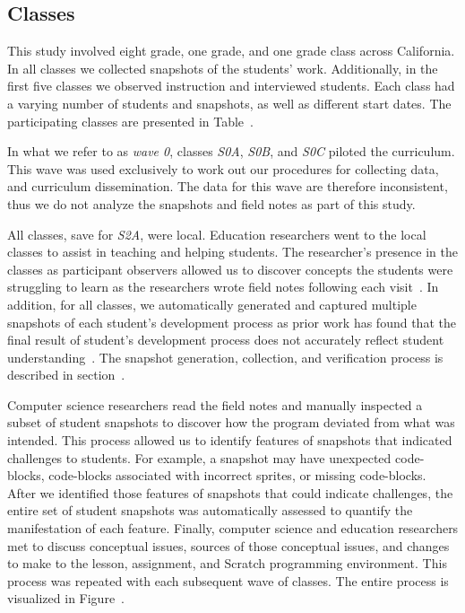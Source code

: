 \subsection{Classes}
This study involved eight  grade, one  grade, and one 
grade class across California. In all classes we collected snapshots of the
students' work. Additionally, in the first five classes we observed instruction
and interviewed students. Each class had a varying number of students and
snapshots, as well as different start dates. The participating classes are
presented in Table~.

In what we refer to as \emph{wave 0}, classes \emph{S0A}, \emph{S0B}, and
\emph{S0C} piloted the curriculum. This wave was used exclusively to work out
our procedures for collecting data, and curriculum dissemination. The data for
this wave are therefore inconsistent, thus we do not analyze the snapshots and
field notes as part of this study.

All classes, save for \emph{S2A}, were local. Education researchers went to the
local classes to assist in teaching and helping students. The researcher's
presence in the classes as participant observers allowed us to discover
concepts the students were struggling to learn as the researchers wrote field
notes following each visit~\cite{spradley80}. In addition, for all classes, we
automatically generated and captured multiple snapshots of each student's
development process as prior work has found that the final result of student's
development process does not accurately reflect student
understanding~\cite{Piech:2012:MSL:2157136.2157182,brennan12}. The snapshot
generation, collection, and verification process is described in
section~.

Computer science researchers read the field notes and manually inspected a
subset of student snapshots to discover how the program deviated from what was
intended. This process allowed us to identify features of snapshots that
indicated challenges to students. For example, a snapshot may have unexpected
code-blocks, code-blocks associated with incorrect sprites, or missing
code-blocks.  After we identified those features of snapshots that could
indicate challenges, the entire set of student snapshots was automatically
assessed to quantify the manifestation of each feature. Finally, computer
science and education researchers met to discuss conceptual issues, sources of
those conceptual issues, and changes to make to the lesson, assignment, and
Scratch programming environment. This process was repeated with each subsequent
wave of classes. The entire process is visualized in
Figure~.

